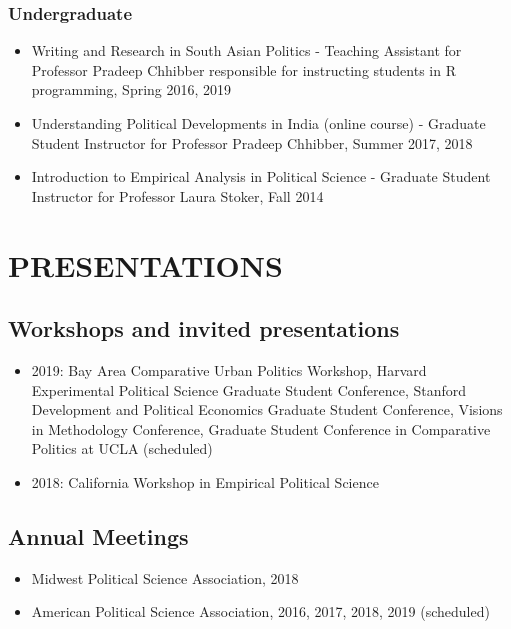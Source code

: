 \documentclass[12pt]{article}
\begin{document}
\subsubsection*{Undergraduate}
\begin{itemize}
		\item[]Writing and Research in South Asian Politics - Teaching Assistant for Professor Pradeep Chhibber responsible for instructing students in \textsf{R} programming, Spring 2016, 2019
	\item[]Understanding Political Developments in India (online course) - Graduate Student Instructor for Professor Pradeep Chhibber, Summer 2017, 2018
	\item[]Introduction to Empirical Analysis in Political Science - Graduate Student Instructor for Professor Laura Stoker, Fall 2014	
\end{itemize}

\vspace{5mm}
\section*{PRESENTATIONS}
\subsection*{Workshops and invited presentations}
\begin{itemize}[nosep]
\item[] 2019: Bay Area Comparative Urban Politics Workshop, Harvard Experimental Political Science Graduate Student Conference, Stanford Development and Political Economics Graduate Student Conference, Visions in Methodology Conference, Graduate Student Conference in Comparative Politics at UCLA (scheduled)


\item[] 2018: California Workshop in Empirical Political Science
\end{itemize}
\subsection*{Annual Meetings}

\begin{itemize}[nosep]
\item[]Midwest Political Science Association, 2018
	\item[]American Political Science Association, 2016, 2017, 2018, 2019 (scheduled)
	
	
	
\end{itemize}
\end{document}
